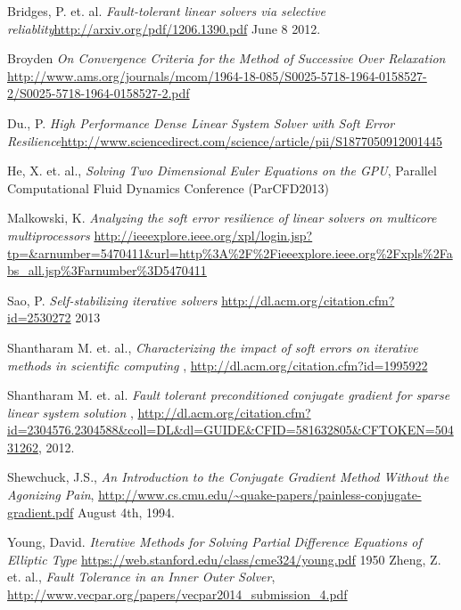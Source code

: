 \documentclass[a4paper]{article}
\begin{document}
\begin{thebibliography}{1}
 Bridges, P. et. al. \emph{Fault-tolerant linear solvers via selective reliablity}\url{http://arxiv.org/pdf/1206.1390.pdf} June 8 2012.

 Broyden \emph{On Convergence Criteria for the Method of Successive Over Relaxation} \url{http://www.ams.org/journals/mcom/1964-18-085/S0025-5718-1964-0158527-2/S0025-5718-1964-0158527-2.pdf}

 Du., P. \emph{High Performance Dense Linear System Solver
with Soft Error Resilience}\url{http://www.sciencedirect.com/science/article/pii/S1877050912001445}

 He, X. et. al., \emph{Solving Two Dimensional Euler Equations on the GPU}, Parallel Computational Fluid Dynamics Conference (ParCFD2013)

\bibitem{} Malkowski, K. \emph{Analyzing the soft error resilience of linear solvers on multicore multiprocessors} \url{http://ieeexplore.ieee.org/xpl/login.jsp?tp=&arnumber=5470411&url=http%3A%2F%2Fieeexplore.ieee.org%2Fxpls%2Fabs_all.jsp%3Farnumber%3D5470411}

 Sao, P. \emph{Self-stabilizing iterative solvers} \url{http://dl.acm.org/citation.cfm?id=2530272} 2013

 Shantharam M. et. al., \emph{Characterizing the impact of soft errors on iterative methods in scientific computing
}, \url{http://dl.acm.org/citation.cfm?id=1995922}

 Shantharam M. et. al. \emph{Fault tolerant preconditioned conjugate gradient for sparse linear system solution
}, \url{http://dl.acm.org/citation.cfm?id=2304576.2304588&coll=DL&dl=GUIDE&CFID=581632805&CFTOKEN=50431262}, 2012.

 Shewchuck, J.S., \emph{An Introduction to the Conjugate Gradient Method Without the Agonizing Pain}, \url{http://www.cs.cmu.edu/~quake-papers/painless-conjugate-gradient.pdf} August 4th, 1994.

\bibitem{} Young, David. \emph{Iterative Methods for Solving Partial Difference Equations of Elliptic Type} \url{https://web.stanford.edu/class/cme324/young.pdf} 1950
  Zheng, Z. et. al., \emph{Fault Tolerance in an Inner Outer Solver}, \url{http://www.vecpar.org/papers/vecpar2014_submission_4.pdf}

\end{thebibliography}
\end{document}
